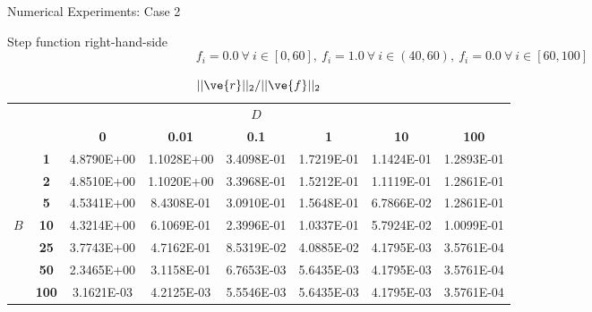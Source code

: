 \documentclass{beamer}
\begin{document}
\begin{frame}{Numerical Experiments: Case 2}

  Step function right-hand-side
  \[
  f_i = 0.0\ \forall\ i \in [0,60],\ 
  f_i = 1.0\ \forall\ i \in (40,60),\ 
  f_i = 0.0\ \forall\ i \in [60,100]
  \]

  {\tiny
    \begin{table}[htpb!]
      \begin{center}
        \caption{$||\ve{r}||_2 / ||\ve{f}||_2$}
        \begin{tabular}{cccccccc}\hline\hline
          \multicolumn{1}{c}{} & \multicolumn{1}{c}{}&
          \multicolumn{1}{c}{}& \multicolumn{1}{c}{}&
          \multicolumn{1}{c}{$D$} & \multicolumn{1}{c}{}&
          \multicolumn{1}{c}{}& \multicolumn{1}{c}{} \\
          & & \textbf{0} & \textbf{0.01} & \textbf{0.1} & \textbf{1} &
          \textbf{10} & \textbf{100} \\
& \textbf{1} & 4.8790E+00 & 1.1028E+00 & 3.4098E-01 & 1.7219E-01 & 1.1424E-01 &
1.2893E-01 \\
& \textbf{2} & 4.8510E+00 & 1.1020E+00 & 3.3968E-01 & 1.5212E-01 & 1.1119E-01 &
1.2861E-01 \\
& \textbf{5} & 4.5341E+00 & 8.4308E-01 & 3.0910E-01 & 1.5648E-01 & 6.7866E-02 &
1.2861E-01 \\
$B$ & \textbf{10} & 4.3214E+00 & 6.1069E-01 & 2.3996E-01 & 1.0337E-01 & 5.7924E-02 &
1.0099E-01 \\
& \textbf{25} & 3.7743E+00 & 4.7162E-01 & 8.5319E-02 & 4.0885E-02 & 4.1795E-03 &
3.5761E-04 \\
& \textbf{50} & 2.3465E+00 & 3.1158E-01 & 6.7653E-03 & 5.6435E-03 & 4.1795E-03 &
3.5761E-04 \\
& \textbf{100} & 3.1621E-03 & 4.2125E-03 & 5.5546E-03 & 5.6435E-03 & 4.1795E-03 &
3.5761E-04 \\
          \hline\hline
        \end{tabular}
      \end{center}
    \end{table}
  }

\end{frame}
\end{document}
